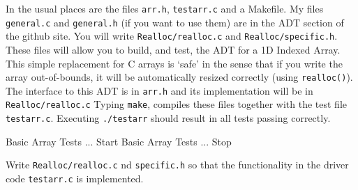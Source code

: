 In the usual places are the files \verb^arr.h^, \verb^testarr.c^
and a Makefile. My files \verb^general.c^ and \verb^general.h^ (if you want to
use them) are in the ADT section of the github site.
You will write \verb^Realloc/realloc.c^ and \verb^Realloc/specific.h^.
These files will allow you to build, and test, the
ADT for a 1D Indexed Array. This simple replacement for C arrays is
`safe' in the sense that if you write the array out-of-bounds, it
will be automatically resized correctly (using \verb^realloc()^). The
interface to this ADT is in \verb^arr.h^ and its implementation will be in \verb^Realloc/realloc.c^
Typing \verb^make^, compiles these files together with the test
file \verb^testarr.c^. Executing \verb^./testarr^ should result in all
tests passing correctly.

\begin{terminaloutput}
Basic Array Tests ... Start
Basic Array Tests ... Stop
\end{terminaloutput}

\begin{exercise}
\label{ex:indarray}
Write \verb^Realloc/realloc.c^ nd \verb^specific.h^ so that the functionality in the driver code \verb^testarr.c^ is implemented.
\end{exercise}
